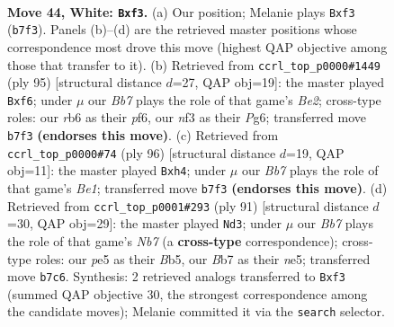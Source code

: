 \documentclass[11pt]{article}
\begin{document}
\clearpage

\begin{figure}[p]\centering
\begin{subfigure}{0.46\textwidth}\centering
\resizebox{\linewidth}{!}{%
\newchessgame
\chessboard[
  setfen={8/1B4k1/1r6/4p1p1/5p2/5n2/8/5K2 w - - 0 44},
  showmover=false,
  pgfstyle=straightmove, color=movearrow, markmove={b7-f3}
]}
\caption{}
\end{subfigure}\hfill
\begin{subfigure}{0.46\textwidth}\centering
\resizebox{\linewidth}{!}{%
\newchessgame
\chessboard[
  setfen={6k1/4b3/5Pp1/8/3N1P2/2p1P3/4K3/8 b - - 0 48},
  showmover=false,
  pgfstyle=straightmove, color=movearrow, markmove={e7-f6}
]}
\caption{}
\end{subfigure}
\\[4pt]
\begin{subfigure}{0.46\textwidth}\centering
\resizebox{\linewidth}{!}{%
\newchessgame
\chessboard[
  setfen={8/8/4k1p1/7p/4K2n/8/8/4B3 w - - 0 49},
  showmover=false,
  pgfstyle=straightmove, color=movearrow, markmove={e1-h4}
]}
\caption{}
\end{subfigure}\hfill
\begin{subfigure}{0.46\textwidth}\centering
\resizebox{\linewidth}{!}{%
\newchessgame
\chessboard[
  setfen={8/6k1/4r3/1b2N3/3P2PP/4P3/1nR5/6K1 b - - 0 46},
  showmover=false,
  pgfstyle=straightmove, color=movearrow, markmove={b2-d3}
]}
\caption{}
\end{subfigure}
\caption{\textbf{Move 44, White: \texttt{Bxf3}.} (a) Our position; Melanie plays \texttt{Bxf3} (\texttt{b7f3}). Panels (b)--(d) are the retrieved master positions whose correspondence most drove this move (highest QAP objective among those that transfer to it). (b) Retrieved from \texttt{ccrl\_top\_p0000\#1449} (ply 95) [structural distance $d$=27, QAP obj=19]: the master played \texttt{Bxf6}; under $\mu$ our \emph{Bb7} plays the role of that game's \emph{Be2}; cross-type roles: our \emph{r}b6 as their \emph{p}f6, our \emph{n}f3 as their \emph{P}g6; transferred move \texttt{b7f3} \textbf{(endorses this move)}. (c) Retrieved from \texttt{ccrl\_top\_p0000\#74} (ply 96) [structural distance $d$=19, QAP obj=11]: the master played \texttt{Bxh4}; under $\mu$ our \emph{Bb7} plays the role of that game's \emph{Be1}; transferred move \texttt{b7f3} \textbf{(endorses this move)}. (d) Retrieved from \texttt{ccrl\_top\_p0001\#293} (ply 91) [structural distance $d$=30, QAP obj=29]: the master played \texttt{Nd3}; under $\mu$ our \emph{Bb7} plays the role of that game's \emph{Nb7} (a \textbf{cross-type} correspondence); cross-type roles: our \emph{p}e5 as their \emph{B}b5, our \emph{B}b7 as their \emph{n}e5; transferred move \texttt{b7c6}. Synthesis: 2 retrieved analogs transferred to \texttt{Bxf3} (summed QAP objective 30, the strongest correspondence among the candidate moves); Melanie committed it via the \texttt{search} selector.}
\label{fig:thought-m86}
\end{figure}
\end{document}
